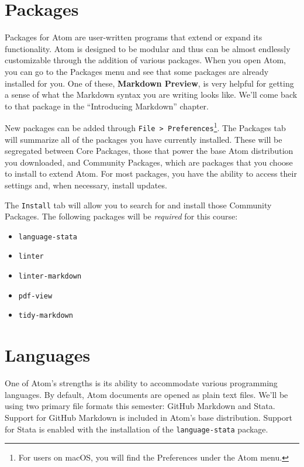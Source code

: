 \documentclass[]{book}
\providecommand{\tightlist}{%
  \setlength{\itemsep}{0pt}\setlength{\parskip}{0pt}}
\let\rmarkdownfootnote\footnote%
\def\footnote{\protect\rmarkdownfootnote}
\begin{document}
\section{Packages}\label{packages}

Packages for Atom are user-written programs that extend or expand its
functionality. Atom is designed to be modular and thus can be almost
endlessly customizable through the addition of various packages. When
you open Atom, you can go to the Packages menu and see that some
packages are already installed for you. One of these, \textbf{Markdown
Preview}, is very helpful for getting a sense of what the Markdown
syntax you are writing looks like. We'll come back to that package in
the ``Introducing Markdown'' chapter.

New packages can be added through
\texttt{File\ \textgreater{}\ Preferences}\footnote{For users on macOS,
  you will find the Preferences under the Atom menu.}. The Packages tab
will summarize all of the packages you have currently installed. These
will be segregated between Core Packages, those that power the base Atom
distribution you downloaded, and Community Packages, which are packages
that you choose to install to extend Atom. For most packages, you have
the ability to access their settings and, when necessary, install
updates.

The \texttt{Install} tab will allow you to search for and install those
Community Packages. The following packages will be \emph{required} for
this course:

\begin{itemize}
\tightlist
\item
  \texttt{language-stata}
\item
  \texttt{linter}
\item
  \texttt{linter-markdown}
\item
  \texttt{pdf-view}
\item
  \texttt{tidy-markdown}
\end{itemize}

\section{Languages}\label{languages}

One of Atom's strengths is its ability to accommodate various
programming languages. By default, Atom documents are opened as plain
text files. We'll be using two primary file formats this semester:
GitHub Markdown and Stata. Support for GitHub Markdown is included in
Atom's base distribution. Support for Stata is enabled with the
installation of the \texttt{language-stata} package.
\end{document}
